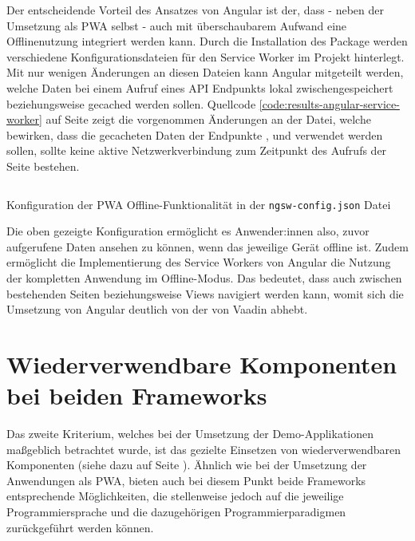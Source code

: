 \documentclass[a4paper,12pt,twoside]{scrreprt}
\begin{document}
Der entscheidende Vorteil des Ansatzes von Angular ist der, dass - neben der Umsetzung als \ac{PWA} selbst - auch mit überschaubarem Aufwand eine Offlinenutzung integriert werden kann. Durch die Installation des  Package werden verschiedene Konfigurationsdateien für den Service Worker im Projekt hinterlegt. Mit nur wenigen Änderungen an diesen Dateien kann Angular mitgeteilt werden, welche Daten bei einem Aufruf eines API Endpunkts lokal zwischengespeichert beziehungsweise gecached werden sollen. Quellcode \ref{code:results-angular-service-worker} auf Seite \pageref{code:results-angular-service-worker} zeigt die vorgenommen Änderungen an der  Datei, welche bewirken, dass die gecacheten Daten der Endpunkte ,  und  verwendet werden sollen, sollte keine aktive Netzwerkverbindung zum Zeitpunkt des Aufrufs der Seite bestehen.

\begin{listing}[ht]
    \renewcommand{\fcolorbox}[4][]{#4}
    \inputminted[fontsize=\footnotesize,linenos,breaklines]{json}{code/Luidold_Results-Angular-ServiceWorker.json}
    \caption[Konfiguration der \ac{PWA} Offline-Funktionalität in der \texttt{ngsw-config.json} Datei]{Konfiguration der \ac{PWA} Offline-Funktionalität in der \texttt{ngsw-config.json} Datei}
    \label{code:results-angular-service-worker}
\end{listing}

Die oben gezeigte Konfiguration ermöglicht es Anwender:innen also, zuvor aufgerufene Daten ansehen zu können, wenn das jeweilige Gerät offline ist. Zudem ermöglicht die Implementierung des Service Workers von Angular die Nutzung der kompletten Anwendung im Offline-Modus. Das bedeutet, dass auch zwischen bestehenden Seiten beziehungsweise Views navigiert werden kann, womit sich die Umsetzung von Angular deutlich von der von Vaadin abhebt.

\section{Wiederverwendbare Komponenten bei beiden Frameworks}
\label{sec:ergebnisse-wiederverwendbarkeit}
Das zweite Kriterium, welches bei der Umsetzung der Demo-Applikationen maßgeblich betrachtet wurde, ist das gezielte Einsetzen von wiederverwendbaren Komponenten (siehe dazu \textit{} auf Seite \pageref{sub-sec:kriterien-web-components}). Ähnlich wie bei der Umsetzung der Anwendungen als \ac{PWA}, bieten auch bei diesem Punkt beide Frameworks entsprechende Möglichkeiten, die stellenweise jedoch auf die jeweilige Programmiersprache und die dazugehörigen Programmierparadigmen zurückgeführt werden können.
\end{document}
